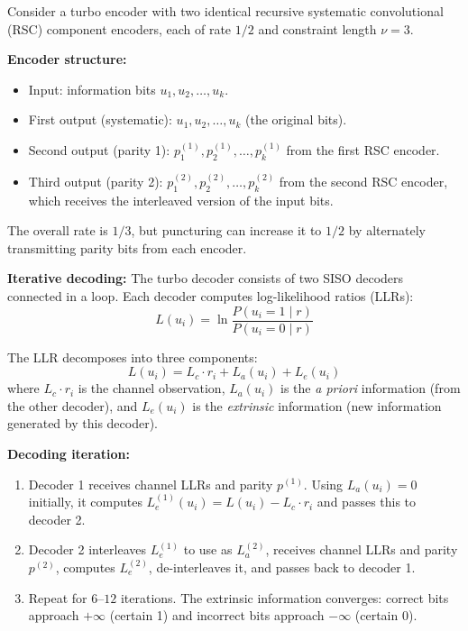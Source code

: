 \begin{example}
Consider a turbo encoder with two identical recursive systematic convolutional (RSC) component encoders, each of rate $1/2$ and constraint length $\nu = 3$.

\textbf{Encoder structure:}
\begin{itemize}
\item Input: information bits $u_1, u_2, \dots, u_k$.
\item First output (systematic): $u_1, u_2, \dots, u_k$ (the original bits).
\item Second output (parity 1): $p^{(1)}_1, p^{(1)}_2, \dots, p^{(1)}_k$ from the first RSC encoder.
\item Third output (parity 2): $p^{(2)}_1, p^{(2)}_2, \dots, p^{(2)}_k$ from the second RSC encoder, which receives the interleaved version of the input bits.
\end{itemize}

The overall rate is $1/3$, but puncturing can increase it to $1/2$ by alternately transmitting parity bits from each encoder.

\textbf{Iterative decoding:}
The turbo decoder consists of two SISO decoders connected in a loop. Each decoder computes log-likelihood ratios (LLRs):
\[
L(u_i) = \ln \frac{P(u_i = 1 \mid r)}{P(u_i = 0 \mid r)}
\]

The LLR decomposes into three components:
\[
L(u_i) = L_c \cdot r_i + L_a(u_i) + L_e(u_i)
\]
where $L_c \cdot r_i$ is the channel observation, $L_a(u_i)$ is the \emph{a priori} information (from the other decoder), and $L_e(u_i)$ is the \emph{extrinsic} information (new information generated by this decoder).

\textbf{Decoding iteration:}
\begin{enumerate}
\item Decoder 1 receives channel LLRs and parity $p^{(1)}$. Using $L_a(u_i) = 0$ initially, it computes $L_e^{(1)}(u_i) = L(u_i) - L_c \cdot r_i$ and passes this to decoder 2.
\item Decoder 2 interleaves $L_e^{(1)}$ to use as $L_a^{(2)}$, receives channel LLRs and parity $p^{(2)}$, computes $L_e^{(2)}$, de-interleaves it, and passes back to decoder 1.
\item Repeat for $6$--$12$ iterations. The extrinsic information converges: correct bits approach $+\infty$ (certain 1) and incorrect bits approach $-\infty$ (certain 0).
\end{enumerate}


\end{example}
